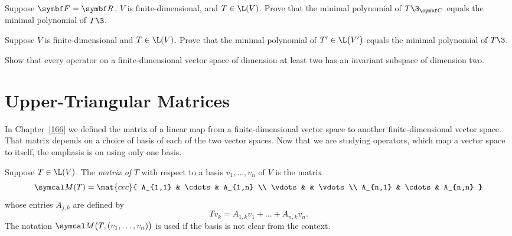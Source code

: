 \begin{exercises}

\exercise
Suppose $\F{} = \R{}$, $V$ is finite-dimensional, and $T \in \L(V)$. Prove that the minimal polynomial of $T\3_{\C{}}$ equals the minimal polynomial of $T\3$.


\exercise
Suppose $V$ is finite-dimensional and $T \in \L(V)$. Prove that the minimal polynomial of $T' \in \L\paren[\big]{V'}$ equals the minimal polynomial of $T\3$.\label{5dualmin}


\exercise
Show that every operator on a finite-dimensional vector space of dimension at least two has an invariant subspace of dimension two.\label{5inv2}


\end{exercises}

\section{Upper-Triangular Matrices} \label{4utm}

In Chapter~\ref{166} we defined the matrix of a linear map from a finite-dimensional vector space to another finite-dimensional vector space.  That matrix depends on a choice of basis of each of the two vector spaces.  Now that we are studying operators, which map a vector space to itself, the emphasis is on using only one basis.

{Suppose $T \in \L(V)$. The \emph{matrix of} $T$ with respect to a basis $v_1, \dots, v_n$ of $V$ is the  matrix
\vspace{-.04in} %
\[
\M(T) = \mat{ccc}{
A_{1,1} & \cdots & A_{1,n} \\
\vdots &   & \vdots \\
A_{n,1} & \cdots & A_{n,n} }
\]
whose entries $A_{j,k}$ are defined by
\[
Tv_k = A_{1,k} v_1 + \dots + A_{n,k} v_n.
\]
The notation $\M\bigl( T, (v_1, \dots, v_n) \bigr)$ is used if the basis is not clear from the context.
}

